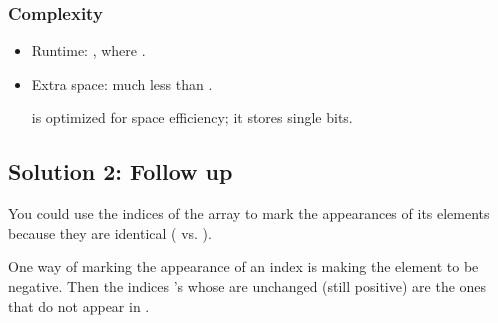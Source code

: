 \documentclass[letterpaper,12pt,english]{book}
\begin{document}
\subsubsection{Complexity}
\label{\detokenize{Array/01_ARR_448_Find_All_Numbers_Disappeared_in_an_Array:complexity}}\begin{itemize}
\item {} 
\sphinxAtStartPar
Runtime: , where .

\item {} 
\sphinxAtStartPar
Extra space: much less than . %
\begin{footnote}[6]\sphinxAtStartFootnote
{}
%
\end{footnote} is optimized for space efficiency; it stores single bits.

\end{itemize}


\subsection{Solution 2: Follow up}
\label{\detokenize{Array/01_ARR_448_Find_All_Numbers_Disappeared_in_an_Array:solution-2-follow-up}}
\sphinxAtStartPar
You could use the indices of the array  to mark the appearances of its elements because they are identical (\sphinxcode{\sphinxupquote{{[}1, n{]}}} vs. \sphinxcode{\sphinxupquote{{[}0, n\sphinxhyphen{}1{]}}}).

\sphinxAtStartPar
One way of marking the appearance of an index  is making the element  to be negative. Then the indices ’s whose  are unchanged (still positive) are the ones that do not appear in .
\end{document}
